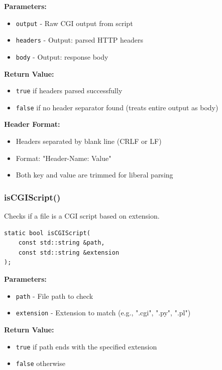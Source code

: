 \documentclass[11pt,a4paper]{article}
\begin{document}
\textbf{Parameters:}
\begin{itemize}
    \item \texttt{output} - Raw CGI output from script
    \item \texttt{headers} - Output: parsed HTTP headers
    \item \texttt{body} - Output: response body
\end{itemize}

\textbf{Return Value:}
\begin{itemize}
    \item \texttt{true} if headers parsed successfully
    \item \texttt{false} if no header separator found (treats entire output as body)
\end{itemize}

\textbf{Header Format:}
\begin{itemize}
    \item Headers separated by blank line (CRLF or LF)
    \item Format: "Header-Name: Value"
    \item Both key and value are trimmed for liberal parsing
\end{itemize}

\subsubsection{isCGIScript()}

Checks if a file is a CGI script based on extension.

\begin{lstlisting}[caption=isCGIScript() Static Method]
static bool isCGIScript(
    const std::string &path,
    const std::string &extension
);
\end{lstlisting}

\textbf{Parameters:}
\begin{itemize}
    \item \texttt{path} - File path to check
    \item \texttt{extension} - Extension to match (e.g., ".cgi", ".py", ".pl")
\end{itemize}

\textbf{Return Value:}
\begin{itemize}
    \item \texttt{true} if path ends with the specified extension
    \item \texttt{false} otherwise
\end{itemize}
\end{document}
